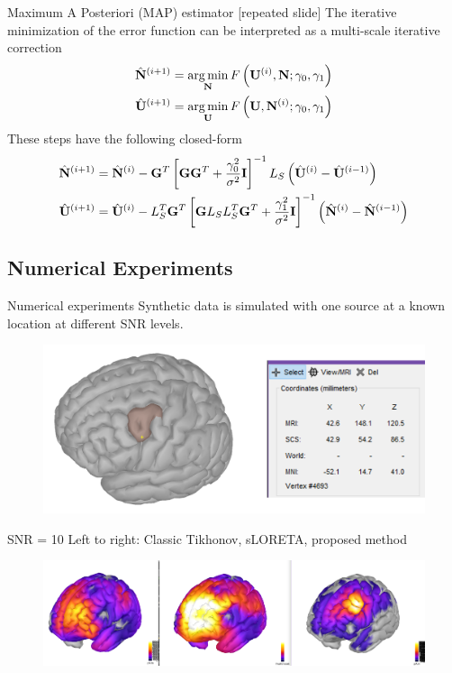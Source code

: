 \documentclass[progressbar=head]{beamer}
\begin{document}
\begin{frame}{Maximum A Posteriori (MAP) estimator [repeated slide]}
    The iterative minimization of the error function can be interpreted as a multi-scale iterative correction
    \begin{align}
        \hat{\mathbf{N}}^{(i+1)} &= \operatorname*{arg\,min}_{\mathbf{N}} F\left( \mathbf{U}^{(i)},\mathbf{N}; \gamma_0, \gamma_1 \right)
        \\
        \hat{\mathbf{U}}^{(i+1)} &= \operatorname*{arg\,min}_{\mathbf{U}} F\left( \mathbf{U},\mathbf{N}^{(i)}; \gamma_0, \gamma_1 \right)
    \end{align}
    These steps have the following closed-form
    \begin{align}
        \hat{\mathbf{N}}^{(i+1)} &=
        \hat{\mathbf{N}}^{(i)}
        -
        \mathbf{G}^T \left[ \mathbf{G} \mathbf{G}^T + \frac{\gamma_0^2}{\sigma^2} \mathbf{I} \right]^{-1} L_S \left( \hat{\mathbf{U}}^{(i)}-\hat{\mathbf{U}}^{(i-1)}  \right)
        \\
        \hat{\mathbf{U}}^{(i+1)} &=
        \hat{\mathbf{U}}^{(i)}
        -
        L_S^T \mathbf{G}^T \left[ \mathbf{G} L_S L_S^T \mathbf{G}^T + \frac{\gamma_1^2}{\sigma^2} \mathbf{I} \right]^{-1} \left( \hat{\mathbf{N}}^{(i)}-\hat{\mathbf{N}}^{(i-1)}  \right)
    \end{align}
\end{frame}



{
\subsection{Numerical Experiments}
}

\begin{frame}{Numerical experiments}
Synthetic data is simulated with one source at a known location at different SNR levels. 
\begin{figure}
\centering
\includegraphics[width=0.8\linewidth]{./img_oldbeamer/protocol1}
\end{figure}
\end{frame}

\begin{frame}{SNR = 10}
Left to right: Classic Tikhonov, sLORETA, proposed method
\begin{figure}
\centering
\includegraphics[width=1\linewidth]{./img_oldbeamer/comparison1}
\end{figure}
\end{frame}
\end{document}
